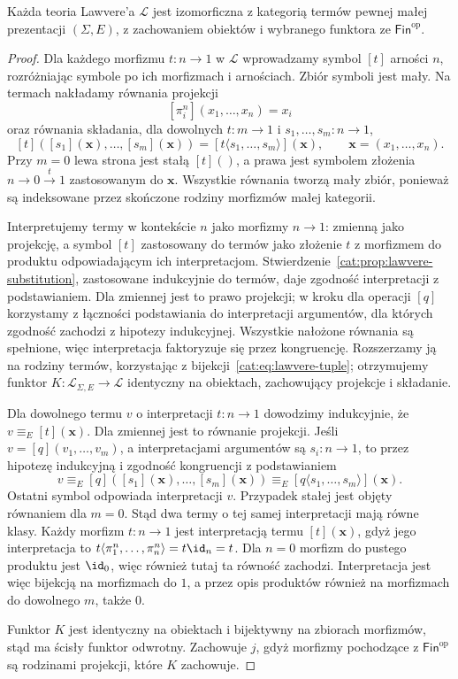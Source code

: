 \begin{twierdzenie}\label{cat:thm:lawvere-presentation}
Każda teoria Lawvere'a $\mathcal L$ jest izomorficzna z kategorią termów pewnej małej prezentacji $(\Sigma,E)$, z zachowaniem obiektów i wybranego funktora ze $\mathsf{Fin}^{\mathrm{op}}$.
\end{twierdzenie}
\begin{proof}
Dla każdego morfizmu $t:n\to1$ w $\mathcal L$ wprowadzamy symbol $[t]$ arności $n$, rozróżniając symbole po ich morfizmach i arnościach. Zbiór symboli jest mały. Na termach nakładamy równania projekcji
\[
 [\pi_i^n](x_1,\ldots,x_n)=x_i
\]
oraz równania składania, dla dowolnych $t:m\to1$ i $s_1,\ldots,s_m:n\to1$,
\[
 [t]([s_1](\mathbf x),\ldots,[s_m](\mathbf x))
 =[t\langle s_1,\ldots,s_m\rangle](\mathbf x),
 \qquad \mathbf x=(x_1,\ldots,x_n).
\]
Przy $m=0$ lewa strona jest stałą $[t]()$, a prawa jest symbolem złożenia $n\to0\xrightarrow{t}1$ zastosowanym do $\mathbf x$. Wszystkie równania tworzą mały zbiór, ponieważ są indeksowane przez skończone rodziny morfizmów małej kategorii.

Interpretujemy termy w kontekście $n$ jako morfizmy $n\to1$: zmienną jako projekcję, a symbol $[t]$ zastosowany do termów jako złożenie $t$ z morfizmem do produktu odpowiadającym ich interpretacjom. Stwierdzenie~\ref{cat:prop:lawvere-substitution}, zastosowane indukcyjnie do termów, daje zgodność interpretacji z podstawianiem. Dla zmiennej jest to prawo projekcji; w kroku dla operacji $[q]$ korzystamy z łączności podstawiania do interpretacji argumentów, dla których zgodność zachodzi z hipotezy indukcyjnej. Wszystkie nałożone równania są spełnione, więc interpretacja faktoryzuje się przez kongruencję. Rozszerzamy ją na rodziny termów, korzystając z bijekcji~\eqref{cat:eq:lawvere-tuple}; otrzymujemy funktor $K:\mathcal L_{\Sigma,E}\to\mathcal L$ identyczny na obiektach, zachowujący projekcje i składanie.

Dla dowolnego termu $v$ o interpretacji $t:n\to1$ dowodzimy indukcyjnie, że $v\equiv_E[t](\mathbf x)$. Dla zmiennej jest to równanie projekcji. Jeśli $v=[q](v_1,\ldots,v_m)$, a interpretacjami argumentów są $s_i:n\to1$, to przez hipotezę indukcyjną i zgodność kongruencji z podstawianiem
\[
 v\equiv_E[q]([s_1](\mathbf x),\ldots,[s_m](\mathbf x))
 \equiv_E[q\langle s_1,\ldots,s_m\rangle](\mathbf x).
\]
Ostatni symbol odpowiada interpretacji $v$. Przypadek stałej jest objęty równaniem dla $m=0$. Stąd dwa termy o tej samej interpretacji mają równe klasy. Każdy morfizm $t:n\to1$ jest interpretacją termu $[t](\mathbf x)$, gdyż jego interpretacja to $t\langle\pi_1^n,\ldots,\pi_n^n\rangle=t\id_n=t$. Dla $n=0$ morfizm do pustego produktu jest $\id_0$, więc również tutaj ta równość zachodzi. Interpretacja jest więc bijekcją na morfizmach do $1$, a przez opis produktów również na morfizmach do dowolnego $m$, także $0$.

Funktor $K$ jest identyczny na obiektach i bijektywny na zbiorach morfizmów, stąd ma ścisły funktor odwrotny. Zachowuje $j$, gdyż morfizmy pochodzące z $\mathsf{Fin}^{\mathrm{op}}$ są rodzinami projekcji, które $K$ zachowuje.
\end{proof}

